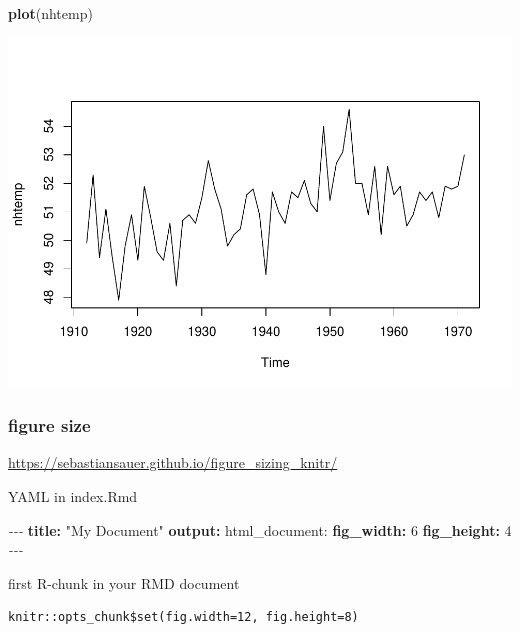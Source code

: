 \documentclass[
]{book}
\newenvironment{Shaded}{\begin{snugshade}}{\end{snugshade}}
\newcommand{\AttributeTok}[1]{\textcolor[rgb]{0.13,0.29,0.53}{#1}}
\newcommand{\DecValTok}[1]{\textcolor[rgb]{0.00,0.00,0.81}{#1}}
\newcommand{\FunctionTok}[1]{\textcolor[rgb]{0.13,0.29,0.53}{\textbf{#1}}}
\newcommand{\KeywordTok}[1]{\textcolor[rgb]{0.13,0.29,0.53}{\textbf{#1}}}
\newcommand{\NormalTok}[1]{#1}
\newcommand{\PreprocessorTok}[1]{\textcolor[rgb]{0.56,0.35,0.01}{\textit{#1}}}
\newcommand{\StringTok}[1]{\textcolor[rgb]{0.31,0.60,0.02}{#1}}
\theoremstyle{definition}
\theoremstyle{definition}
\theoremstyle{definition}
\theoremstyle{definition}
\theoremstyle{remark}
\begin{document}
\begin{Shaded}
\begin{Highlighting}[]
\FunctionTok{plot}\NormalTok{(nhtemp)}
\end{Highlighting}
\end{Shaded}

\includegraphics{202401280001-test_files/figure-latex/unnamed-chunk-5-2.pdf}

\subsubsection{figure size}\label{figure-size}

\url{https://sebastiansauer.github.io/figure_sizing_knitr/}

YAML in index.Rmd

\begin{Shaded}
\begin{Highlighting}[]
\PreprocessorTok{{-}{-}{-} }
\FunctionTok{title}\KeywordTok{:}\AttributeTok{ }\StringTok{"My Document"}\AttributeTok{ }
\FunctionTok{output}\KeywordTok{:}\AttributeTok{ html\_document: }
\FunctionTok{fig\_width}\KeywordTok{:}\AttributeTok{ }\DecValTok{6}\AttributeTok{ }
\FunctionTok{fig\_height}\KeywordTok{:}\AttributeTok{ }\DecValTok{4}\AttributeTok{ }
\PreprocessorTok{{-}{-}{-} }
\end{Highlighting}
\end{Shaded}

first R-chunk in your RMD document

\begin{verbatim}
knitr::opts_chunk$set(fig.width=12, fig.height=8) 
\end{verbatim}
\end{document}
